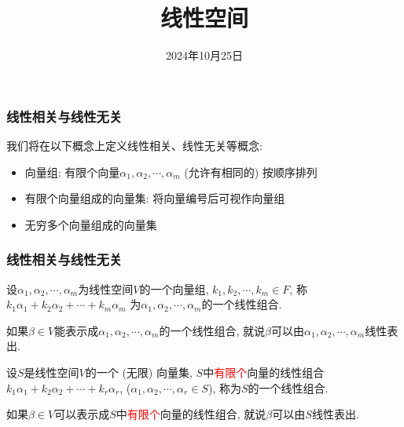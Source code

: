 \documentclass[CJK]{beamer}
\title[线性空间]{线性空间}
\author{}
\institute{}
\date{2024年10月25日}
\begin{document}
	
	\begin{frame}
		\titlepage
	\end{frame}
	
	\begin{frame}
		\frametitle{线性相关与线性无关} \pause
		我们将在以下概念上定义线性相关、线性无关等概念:
		\begin{itemize}
			\item 向量组: 有限个向量$\alpha_{1}, \alpha_{2}, \cdots, \alpha_{m}$ (允许有相同的) 按顺序排列\pause
			\item 有限个向量组成的向量集: 将向量编号后可视作向量组\pause
			\item 无穷多个向量组成的向量集
		\end{itemize}
	\end{frame}

\begin{frame}
	\frametitle{线性相关与线性无关} \pause
	\begin{definition}
		设$\alpha_{1}, \alpha_{2}, \cdots, \alpha_{m}$为线性空间$V$的一个向量组, $k_{1}, k_{2}, \cdots, k_{m}\in F$, 称$k_{1}\alpha_{1}+k_{2}\alpha_{2}+\cdots+k_{m}\alpha_{m}$
		为$\alpha_{1}, \alpha_{2}, \cdots, \alpha_{m}$的一个线性组合. \pause
		
		如果$\beta\in V$能表示成$\alpha_{1}, \alpha_{2}, \cdots, \alpha_{m}$的一个线性组合, 就说$\beta$可以由$\alpha_{1}, \alpha_{2}, \cdots, \alpha_{m}$线性表出. \pause
	\end{definition}

\begin{definition}
	设$S$是线性空间$V$的一个 (无限) 向量集, $S$中\textcolor{red}{有限个}向量的线性组合$k_{1}\alpha_{1}+k_{2}\alpha_{2}+\cdots+k_{r}\alpha_{r}$, ($\alpha_{1}, \alpha_{2}, \cdots, \alpha_{r}\in S$), 称为$S$的一个线性组合. \pause
	
	如果$\beta\in V$可以表示成$S$中\textcolor{red}{有限个}向量的线性组合, 就说$\beta$可以由$S$线性表出.
\end{definition}
\end{frame}
\end{document}
